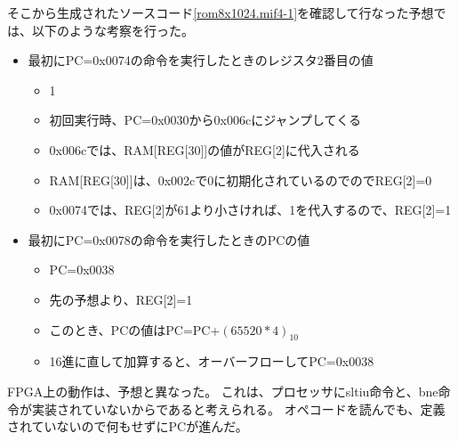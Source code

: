 そこから生成されたソースコード\ref{rom8x1024.mif4-1}を確認して行なった予想では、以下のような考察を行った。
\begin{itemize}
  \item 最初にPC=0x0074の命令を実行したときのレジスタ2番目の値
  \begin{itemize}
    \item 1
    \item 初回実行時、PC=0x0030から0x006cにジャンプしてくる
    \item 0x006cでは、RAM[REG[30]]の値がREG[2]に代入される
    \item RAM[REG[30]]は、0x002cで0に初期化されているのでのでREG[2]=0
    \item 0x0074では、REG[2]が61より小さければ、1を代入するので、REG[2]=1
  \end{itemize}
  \item 最初にPC=0x0078の命令を実行したときのPCの値
  \begin{itemize}
    \item PC=0x0038
    \item 先の予想より、REG[2]=1
    \item このとき、PCの値はPC=PC+$(65520*4)_{10}$
    \item 16進に直して加算すると、オーバーフローしてPC=0x0038
  \end{itemize}
\end{itemize}

FPGA上の動作は、予想と異なった。
これは、プロセッサにsltiu命令と、bne命令が実装されていないからであると考えられる。
オペコードを読んでも、定義されていないので何もせずにPCが進んだ。
